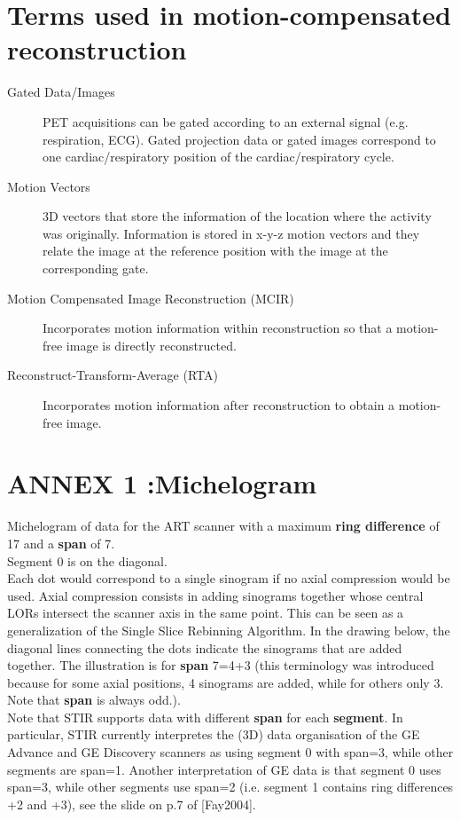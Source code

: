 \documentclass{article}
\begin{document}
\section*{Terms used in motion-compensated reconstruction}

\begin{description}
\item[Gated Data/Images]
PET acquisitions can be gated according to an external signal (e.g. respiration, ECG). Gated projection data or gated images correspond to one cardiac/respiratory position of the cardiac/respiratory cycle. 


\item[Motion Vectors]
3D vectors that store the information of the location where the activity was originally. Information is stored in x-y-z motion vectors and they relate the image at the reference position with the image at the corresponding gate.


\item[Motion Compensated Image Reconstruction (MCIR)]
Incorporates motion information within reconstruction so that a motion-free image is directly reconstructed. 

\item[Reconstruct-Transform-Average (RTA)]
Incorporates motion information after reconstruction to obtain a motion-free image.
\end{description}

\newpage
 \section*{ ANNEX 1 :Michelogram}

Michelogram of data for the ART scanner with a maximum \textbf{ring 
difference} of 17 and a \textbf{span} of 7. \\
Segment 0 is on the diagonal. \\
Each dot would correspond to a single sinogram if no axial compression 
would be used. Axial compression consists in adding sinograms 
together whose central LORs intersect the scanner axis 
in the same point. This can be seen as a generalization of the 
Single Slice Rebinning Algorithm. In the drawing below, the diagonal 
lines connecting the dots indicate the sinograms that are added 
together. The illustration is for \textbf{span} 7=4+3 (this terminology 
was introduced because for some axial positions, 4 sinograms 
are added, while for others only 3. Note that \textbf{span} is always 
odd.).\\
Note that STIR supports data with different \textbf{span} for each \textbf{segment}. 
In particular, STIR currently interpretes the (3D) data organisation of the
GE Advance and GE Discovery scanners as using segment 0 with span=3, while 
other segments are span=1. Another interpretation of GE data is that segment 0 uses
span=3, while other segments use span=2 (i.e. segment 1 contains ring differences +2 and +3), 
see the slide on p.7 of [Fay2004].
\end{document}

